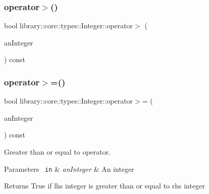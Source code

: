 \subsubsection{\texorpdfstring{operator$>$()}{operator>()}\hspace{0.1cm}{\footnotesize\ttfamily [2/2]}}
{\footnotesize\ttfamily bool library\+::core\+::types\+::\+Integer\+::operator$>$ (\begin{DoxyParamCaption}\item[{const \mbox{\hyperlink{classlibrary_1_1core_1_1types_1_1_integer_a623afb1580f870fd8a1997b1c12c917d}{Integer\+::\+Value\+Type}} \&}]{an\+Integer }\end{DoxyParamCaption}) const}

\mbox{\label{classlibrary_1_1core_1_1types_1_1_integer_ae565ce34bef391725beebb42269d26fe}} 
\subsubsection{\texorpdfstring{operator$>$=()}{operator>=()}\hspace{0.1cm}{\footnotesize\ttfamily [1/2]}}
{\footnotesize\ttfamily bool library\+::core\+::types\+::\+Integer\+::operator$>$= (\begin{DoxyParamCaption}\item[{const \mbox{\hyperlink{classlibrary_1_1core_1_1types_1_1_integer}{Integer}} \&}]{an\+Integer }\end{DoxyParamCaption}) const}



Greater than or equal to operator. 


\begin{DoxyCode}{0}
\end{DoxyCode}



\begin{DoxyParams}[1]{Parameters}
\mbox{\texttt{ in}}  & {\em an\+Integer} & An integer \\
\hline
\end{DoxyParams}
\begin{DoxyReturn}{Returns}
True if lhs integer is greater than or equal to rhs integer 
\end{DoxyReturn}
\mbox{\label{classlibrary_1_1core_1_1types_1_1_integer_a88077b530da644e33e6346837035eb9d}} 
